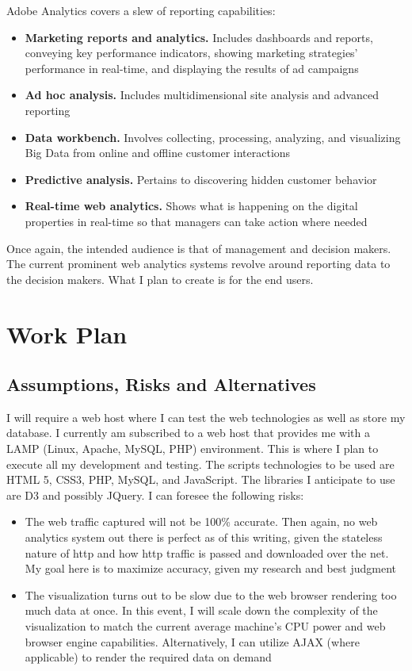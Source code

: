 \documentclass[12pt]{article}
\begin{document}
Adobe Analytics covers a slew of reporting capabilities:

\begin{itemize}
\item \textbf{Marketing reports and analytics.} Includes dashboards and reports, conveying key performance indicators, showing marketing strategies' performance in real-time, and displaying the results of ad campaigns
\item \textbf{Ad hoc analysis.} Includes multidimensional site analysis and advanced reporting
\item \textbf{Data workbench.} Involves collecting, processing, analyzing, and visualizing Big Data from online and offline customer interactions
\item \textbf{Predictive analysis.} Pertains to discovering hidden customer behavior
\item \textbf{Real-time web analytics.} Shows what is happening on the digital properties in real-time so that managers can take action where needed
\end{itemize}

Once again, the intended audience is that of management and decision makers. The current prominent web analytics systems revolve around reporting data to the decision makers. What I plan to create is for the end users.

\null
\vfill
\section{Work Plan}
\subsection{Assumptions, Risks and Alternatives}
I will require a web host where I can test the web technologies as well as store my database. I currently am subscribed to a web host that provides me with a LAMP (Linux, Apache, MySQL, PHP) environment. This is where I plan to execute all my development and testing. The scripts technologies to be used are HTML 5, CSS3, PHP, MySQL, and JavaScript. The libraries I anticipate to use are D3 and possibly JQuery.
I can foresee the following risks:

\begin{itemize}
\item The web traffic captured will not be 100\% accurate. Then again, no web analytics system out there is perfect as of this writing, given the stateless nature of http and how http traffic is passed and downloaded over the net. My goal here is to maximize accuracy, given my research and best judgment
\item The visualization turns out to be slow due to the web browser rendering too much data at once. In this event, I will scale down the complexity of the visualization to match the current average machine's CPU power and web browser engine capabilities. Alternatively, I can utilize AJAX (where applicable) to render the required data on demand
\end{itemize}
\end{document}
